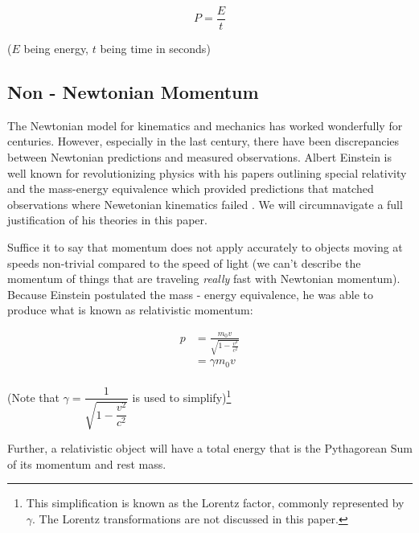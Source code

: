 \documentclass{article}
\begin{document}
                \begin{equation}\label{eq:6}
                    P = \frac{E}{t}
                \end{equation}
                \begin{center}
                    ($E$ being energy, $t$ being time in seconds)
                \end{center}

        \subsection{Non - Newtonian Momentum}
            The Newtonian model for kinematics and mechanics has worked wonderfully for centuries. However, especially in the last century, there have been discrepancies between Newtonian predictions and measured observations.
            Albert Einstein is well known for revolutionizing physics with his papers outlining special relativity and the mass-energy equivalence which provided predictions that matched observations where Newetonian kinematics failed \cite{Einstein1}.
            We will circumnavigate a full justification of his theories in this paper.
            \par
            Suffice it to say that momentum does not apply accurately to objects moving at speeds non-trivial compared to the speed of light (we can't describe the momentum of things that are traveling \emph{really} fast with Newtonian momentum).
            Because Einstein postulated the mass - energy equivalence, he was able to produce what is known as relativistic momentum:

            \begin{equation}\label{eq:7}
                \begin{split}
                    p & = \frac{m_0v}{\sqrt{1 - \frac{v^2}{c^2}}} \\
                    & = \gamma m_0v \\
                \end{split}
            \end{equation}
            \begin{center}
                (Note that $\gamma = \dfrac{1}{\sqrt{1 - \dfrac{v^2}{c^2}}}$ is used to simplify)\footnote{This simplification is known as the Lorentz factor, commonly represented by $\gamma$. The Lorentz transformations are not discussed in this paper.}
            \end{center}

            Further, a relativistic object will have a total energy that is the Pythagorean Sum of its momentum and rest mass.
\end{document}
